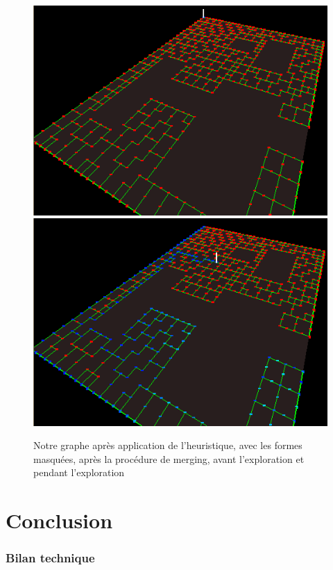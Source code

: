 \documentclass[a4paper,12pt]{report}
\begin{document}
\begin{figure}[!ht]
\centering
\includegraphics[scale=0.5]{Images/merging3.png}
\includegraphics[scale=0.5]{Images/parcours1.png}
\caption{Notre graphe après application de l'heuristique, avec les formes masquées, après la procédure de merging, avant l'exploration et pendant l'exploration}
\end{figure}
\vspace{0.5cm}

\chapter{Conclusion}

\subsection*{Bilan technique}
\end{document}
